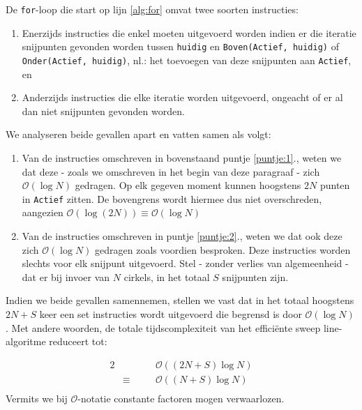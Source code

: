 \documentclass[12pt]{article}
\begin{document}
De \texttt{for}-loop die start op lijn \ref{alg:for} omvat twee soorten instructies: 
\begin{enumerate}
	\item Enerzijds instructies die enkel moeten uitgevoerd worden indien er die iteratie snijpunten gevonden worden tussen \texttt{huidig} en \texttt{Boven(Actief, huidig)} of \texttt{Onder(Actief, huidig)}, nl.: het toevoegen van deze snijpunten aan \texttt{Actief}, en \label{puntje:1}
	\item Anderzijds instructies die elke iteratie worden uitgevoerd, ongeacht of er al dan niet snijpunten gevonden worden.\label{puntje:2}
\end{enumerate}
We analyseren beide gevallen apart en vatten samen als volgt:
\begin{enumerate}
	\item Van de instructies omschreven in bovenstaand puntje \ref{puntje:1}., weten we dat deze - zoals we omschreven in het begin van deze paragraaf - zich $\mathcal{O}(\log N)$ gedragen. Op elk gegeven moment kunnen hoogstens $2N$ punten in \texttt{Actief} zitten. De bovengrens wordt hiermee dus niet overschreden, aangezien  $\mathcal{O}(\log (2N)) \equiv \mathcal{O}(\log N)$ %
	\item Van de instructies omschreven in puntje \ref{puntje:2}., weten we dat ook deze zich $\mathcal{O}(\log N)$ gedragen zoals voordien besproken. Deze instructies worden slechts voor elk snijpunt uitgevoerd. Stel - zonder verlies van algemeenheid - dat er bij invoer van $N$ cirkels, in het totaal $S$ snijpunten zijn.%
\end{enumerate}
Indien we beide gevallen samennemen, stellen we vast dat in het totaal hoogstens $2N+S$ keer een set instructies wordt uitgevoerd die begrensd is  door $\mathcal{O}(\log N)$. Met andere woorden, de totale tijdscomplexiteit van het efficiënte sweep line-algoritme reduceert tot:

\begin{alignat*}{2}
& &&\mathcal{O}((2N+S)\log N) \\
&\equiv\quad && \mathcal{O}((N+S)\log N)\\
\end{alignat*}
Vermits we bij $\mathcal{O}$-notatie constante factoren mogen verwaarlozen.
\end{document}
